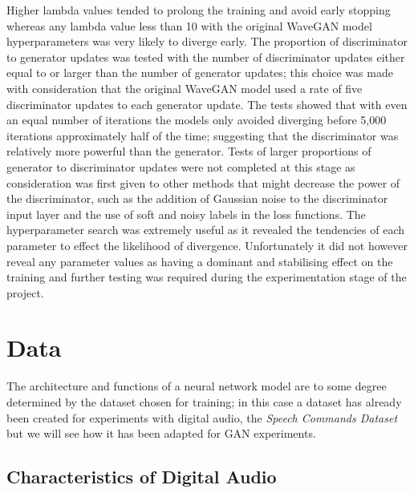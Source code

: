 \documentclass[a4paper, titlepage]{article}
\begin{document}
Higher lambda values tended to prolong the training and avoid early stopping whereas any lambda value less than 10 with the original WaveGAN model hyperparameters was very likely to diverge early.
\newline
\newline
The proportion of discriminator to generator updates was tested with the number of discriminator updates either equal to or larger than the number of generator updates; this choice was made with consideration that the original WaveGAN model used a rate of five discriminator updates to each generator update.
The tests showed that with even an equal number of iterations the models only avoided diverging before 5,000 iterations approximately half of the time; suggesting that the discriminator was relatively more powerful than the generator.
\newline
\newline
Tests of larger proportions of generator to discriminator updates were not completed at this stage as consideration was first given to other methods that might decrease the power of the discriminator, such as the addition of Gaussian noise to the discriminator input layer and the use of soft and noisy labels in the loss functions.
\newline
\newline
The hyperparameter search was extremely useful as it revealed the tendencies of each parameter to effect the likelihood of divergence.
Unfortunately it did not however reveal any parameter values as having a dominant and stabilising effect on the training and further testing was required during the experimentation stage of the project.

\newpage

\section{Data}

The architecture and functions of a neural network model are to some degree determined by the dataset chosen for training; in this case a dataset has already been created for experiments with digital audio, the \textit{Speech Commands Dataset} \citep{speechcommands} but we will see how it has been adapted for \ac{GAN} experiments.

\subsection{Characteristics of Digital Audio}
\end{document}
